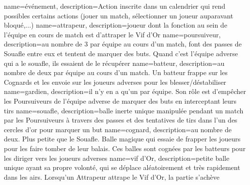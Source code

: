 {
  name=événement,
  description={Action inscrite dans un calendrier qui rend possibles certains actions (jouer un match, sélectionner un joueur auparavant bloqué,...)}
}
{
  name=attrapeur,
  description={joueur dont la fonction au sein de l’équipe en cours de match est d’attraper le Vif d’Or}
}
{
  name=poursuiveur,
  description={au nombre de 3 par équipe au cours d'un match, font des passes de Souafle entre eux et tentent de marquer des buts. Quand c'est l'équipe adverse qui a le souafle, ils essaient de le récupérer}
}
{
  name=batteur,
  description={au nombre de deux par équipe au cours d'un match. Un batteur frappe sur les Cognards et les envoie sur les joueurs adverses pour les blesser/déstabiliser}
}
{
  name=gardien,
  description={il n’y en a qu’un par équipe. Son rôle est d’empêcher les Poursuiveurs de l’équipe adverse de marquer des buts en interceptant leurs tirs}
}
{
  name=souafle,
  description={balle inerte unique manipulée pendant un match par les Poursuiveurs à travers des passes et des tentatives de tirs dans l’un des cercles d’or pour marquer un but}
}
{
  name=cognard,
  description={au nombre de deux. Plus petite que le Souafle. Balle magique qui essaie de frapper les joueurs pour les faire tomber de leur balais. Ces balles sont cognées par les batteurs pour les diriger vers les joueurs adverses}
}
{
  name=vif d’Or,
  description={petite balle unique ayant sa propre volonté, qui se déplace aléatoirement et très rapidement dans les airs. Lorsqu’un Attrapeur attrape le Vif d’Or, la partie s’achève}
}
